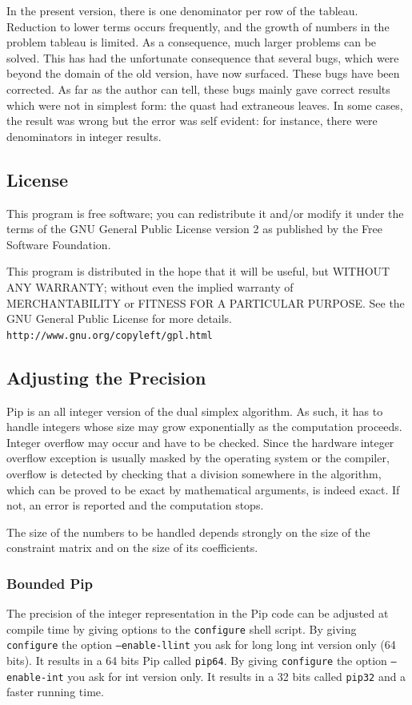 \documentclass[12pt,a4paper]{article}
\begin{document}
In the present version, there is one denominator per row of the tableau.
Reduction to lower terms occurs frequently, and the growth of numbers in the
problem tableau is limited. As a consequence, much larger problems can be
solved. This has had the unfortunate consequence that several bugs, which
were beyond the domain of the old version, have now surfaced. These bugs
have been corrected. As far as the author
 can tell, these bugs mainly gave correct
results which were not in simplest form: the quast had extraneous leaves.
In some cases, the result was wrong but the error was self evident: for 
instance, there were denominators in integer results.

\subsection{License}
This program is free software; you can redistribute it and/or
modify it under the terms of the GNU General Public License version 2
as published by the Free Software Foundation.

This program is distributed in the hope that it will be useful,
but WITHOUT ANY WARRANTY; without even the implied warranty of
MERCHANTABILITY or FITNESS FOR A PARTICULAR PURPOSE.  See the
GNU General Public License for more details.
{\tt http://www.gnu.org/copyleft/gpl.html}

\subsection{Adjusting the Precision}
Pip is an all integer  version of the dual simplex algorithm. As such,
it has to handle integers whose size may grow exponentially as the
computation proceeds. Integer overflow may occur and have to be checked.
Since the hardware integer overflow exception is usually masked by
the operating system or the compiler, overflow is detected by checking
that a division somewhere in the algorithm, which can be proved to be
exact by mathematical arguments, is indeed exact. If not, an error is
reported and the computation stops.

The size of the numbers to be handled depends strongly on the size of the
constraint matrix and on the size of its coefficients.

\subsubsection{Bounded Pip}
The precision of the integer representation in the Pip code can be
adjusted at compile time by giving options to the {\tt configure}
shell script.
By giving {\tt configure} the option {\tt --enable-llint} you ask
for long long int version only (64 bits). It results in a 64 bits Pip
called {\tt pip64}.
By giving {\tt configure} the option {\tt --enable-int} you
ask for int version only. It results in a 32 bits called
{\tt pip32} and a faster running time.
\end{document}
